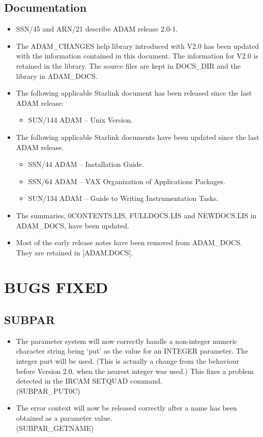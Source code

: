 \subsection{Documentation}
\label{docs}
\begin{itemize}
\item SSN/45 and ARN/21 describe ADAM release 2.0-1.
\item The ADAM\_CHANGES help library introduced with V2.0 has been updated 
with the information contained in this document. The information for V2.0 is
retained in the library.
The source files are kept in DOCS\_DIR and the library in ADAM\_DOCS.
\item The following applicable Starlink document has been released since the
last ADAM release:
\begin{itemize}
\item SUN/144 ADAM -- Unix Version.
\end{itemize}
\item The following applicable Starlink documents have been updated since the
last ADAM release.
\begin{itemize}
\item SSN/44 ADAM -- Installation Guide.
\item SSN/64 ADAM -- VAX Organization of Applications Packages.
\item SUN/134 ADAM -- Guide to Writing Instrumentation Tasks.
\end{itemize}
\item The summaries, 0CONTENTS.LIS, FULLDOCS.LIS and NEWDOCS.LIS in
ADAM\-\_DOCS, have been updated. 
\item Most of the early release notes have been removed from ADAM\_DOCS.
They are retained in [ADAM.DOCS].
\end{itemize}


\section{BUGS FIXED}

\subsection{SUBPAR}
\begin{itemize}
\item The parameter system will now correctly handle a non-integer numeric 
character string being `put' as the value for an INTEGER parameter.
The integer part will be used. (This is actually a change from the behaviour
before Version 2.0, when the nearest integer was used.) 
This fixes a problem detected in the IRCAM SETQUAD command.\\
(SUBPAR\_PUT0C)
\item The error context will now be released correctly after a name has been
obtained as a parameter value.\\
(SUBPAR\_GETNAME)
\end{itemize}

